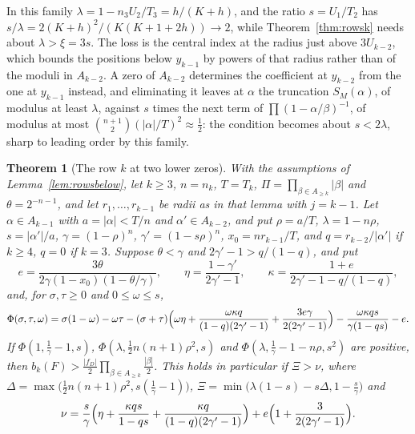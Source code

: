 \documentclass[11pt]{article}
\newtheorem{theorem}{Theorem}[section]
\begin{document}
In this family $\lambda=1-n_3U_2/T_3=h/(K+h)$, and the ratio $s=U_1/T_2$ has
$s/\lambda=2(K+h)^2/(K(K+1+2h))\to2$, while Theorem~\ref{thm:rowsk} needs
about $\lambda>\xi=3s$.  The loss is the central index at the radius just
above $3U_{k-2}$, which bounds the positions below $y_{k-1}$ by powers of
that radius rather than of the moduli in $A_{k-2}$.  A zero of $A_{k-2}$
determines the coefficient at $y_{k-2}$ from the one at $y_{k-1}$ instead,
and eliminating it leaves at $\alpha$ the truncation $S_M(\alpha)$, of
modulus at least $\lambda$, against $s$ times the next term of
$\prod(1-\alpha/\beta)^{-1}$, of modulus at most
$\binom{n+1}2(|\alpha|/T)^2\approx\frac12$: the condition becomes about
$s<2\lambda$, sharp to leading order by this family.

\begin{theorem}[The row $k$ at two lower zeros]\label{thm:rowspair}
With the assumptions of Lemma~\ref{lem:rowsbelow}, let $k\ge3$, $n=n_k$,
$T=T_k$, $\Pi=\prod_{\beta\in A_{\ge k}}|\beta|$ and $\theta=2^{-n-1}$, and
let $r_1,\ldots,r_{k-1}$ be radii as in that lemma with $j=k-1$.  Let
$\alpha\in A_{k-1}$ with $a=|\alpha|<T/n$ and $\alpha'\in A_{k-2}$, and put
$\rho=a/T$, $\lambda=1-n\rho$, $s=|\alpha'|/a$, $\gamma=(1-\rho)^n$,
$\gamma'=(1-s\rho)^n$, $x_0=nr_{k-1}/T$, and $q=r_{k-2}/|\alpha'|$ if
$k\ge4$, $q=0$ if $k=3$.  Suppose $\theta<\gamma$ and
$2\gamma'-1>q/(1-q)$, and put
\[
  e=\frac{3\theta}{2\gamma(1-x_0)(1-\theta/\gamma)},\qquad
  \eta=\frac{1-\gamma'}{2\gamma'-1},\qquad
  \kappa=\frac{1+e}{2\gamma'-1-q/(1-q)},
\]
and, for $\sigma,\tau\ge0$ and $0\le\omega\le s$,
\[
  \Phi(\sigma,\tau,\omega)=\sigma(1-\omega)-\omega\tau
  -(\sigma+\tau)\Bigl(\omega\eta+\frac{\omega\kappa q}{(1-q)(2\gamma'-1)}+\frac{3e\gamma}{2(2\gamma'-1)}\Bigr)
  -\frac{\omega\kappa qs}{\gamma(1-qs)}-e .
\]
If $\Phi(1,\frac1\gamma-1,s)$, $\Phi(\lambda,\frac12n(n+1)\rho^2,s)$ and
$\Phi(\lambda,\frac1\gamma-1-n\rho,s^2)$ are positive, then
$b_k(F)>\frac{|f_D|}2\prod_{\beta\in A_{\ge k}}\frac{|\beta|}2$.  This
holds in particular if $\Xi>\nu$, where
$\Delta=\max\bigl(\frac12n(n+1)\rho^2,s(\frac1\gamma-1)\bigr)$,
$\Xi=\min\bigl(\lambda(1-s)-s\Delta,1-\frac s\gamma\bigr)$ and
\[
  \nu=\frac s\gamma\Bigl(\eta+\frac{\kappa qs}{1-qs}+\frac{\kappa q}{(1-q)(2\gamma'-1)}\Bigr)
  +e\Bigl(1+\frac3{2(2\gamma'-1)}\Bigr).
\]
\end{theorem}
\end{document}
